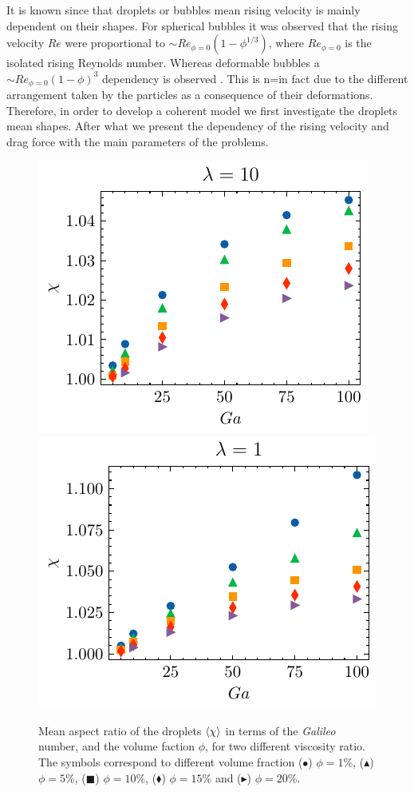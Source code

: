 It is known since  \citet{bunner2003effect} that droplets or bubbles mean rising velocity is mainly dependent on their shapes. 
For spherical bubbles it was observed that the rising velocity $Re$ were proportional to $\sim Re_{\phi=0}(1 - \phi^{1/3})$, where $Re_{\phi=0}$ is the isolated rising Reynolds number. 
Whereas deformable bubbles a $\sim Re_{\phi=0}(1 - \phi)^{3}$ dependency is observed . 
This is n=in fact due to the different arrangement taken by the particles as a consequence of their deformations. 
Therefore, in order to develop a coherent model we first investigate the droplets mean shapes. 
After what we present the dependency of the rising velocity and drag force with the main parameters of the problems.  

\begin{figure}[h!]
    \centering
    \includegraphics[height = 0.35\textwidth]{image/HOMOGENEOUS/fPA/chi_mu_r_0-1.pdf}
    \includegraphics[height = 0.35\textwidth]{image/HOMOGENEOUS/fPA/chi_mu_r_1-0.pdf}
    \caption{Mean aspect ratio of the droplets $\left<\chi\right>$ in terms of the \textit{Galileo} number, and the volume faction $\phi$,  for two different viscosity ratio.  
    The symbols correspond to different volume fraction ($\bullet$) $\phi = 1\%$, ($\blacktriangle$) $\phi = 5\%$, ($\blacksquare$) $\phi = 10\%$, ($\blacklozenge$) $\phi = 15\%$ and ($\blacktriangleright$) $\phi = 20$\%.
    }
    \label{fig:chi}
\end{figure}

